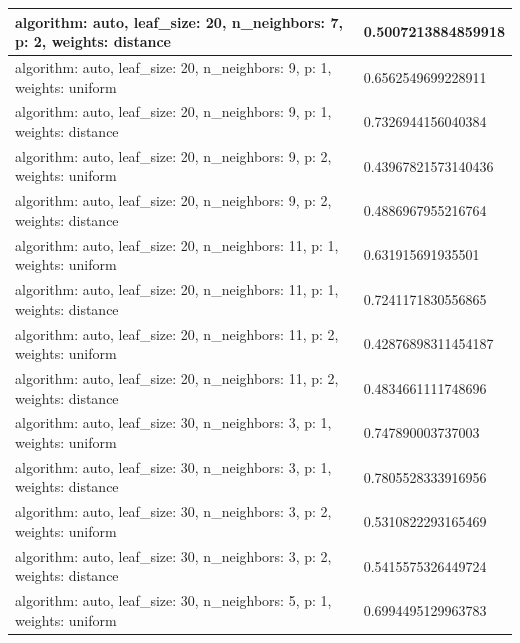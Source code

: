 \documentclass{report}
\begin{document}
{\begin{longtable}{|p{295.6px}|p{100.3px}|}
                    \hline
                    algorithm: auto, leaf\_size: 20, n\_neighbors: 7, p: 2, weights: distance & 0.5007213884859918 \\
                    \hline
                    algorithm: auto, leaf\_size: 20, n\_neighbors: 9, p: 1, weights: uniform & 0.6562549699228911 \\
                    \hline
                    algorithm: auto, leaf\_size: 20, n\_neighbors: 9, p: 1, weights: distance & 0.7326944156040384 \\
                    \hline
                    algorithm: auto, leaf\_size: 20, n\_neighbors: 9, p: 2, weights: uniform & 0.43967821573140436 \\
                    \hline
                    algorithm: auto, leaf\_size: 20, n\_neighbors: 9, p: 2, weights: distance & 0.4886967955216764 \\
                    \hline
                    algorithm: auto, leaf\_size: 20, n\_neighbors: 11, p: 1, weights: uniform & 0.631915691935501 \\
                    \hline
                    algorithm: auto, leaf\_size: 20, n\_neighbors: 11, p: 1, weights: distance & 0.7241171830556865 \\
                    \hline
                    algorithm: auto, leaf\_size: 20, n\_neighbors: 11, p: 2, weights: uniform & 0.42876898311454187 \\
                    \hline
                    algorithm: auto, leaf\_size: 20, n\_neighbors: 11, p: 2, weights: distance & 0.4834661111748696 \\
                    \hline
                    algorithm: auto, leaf\_size: 30, n\_neighbors: 3, p: 1, weights: uniform & 0.747890003737003 \\
                    \hline
                    algorithm: auto, leaf\_size: 30, n\_neighbors: 3, p: 1, weights: distance & 0.7805528333916956 \\
                    \hline
                    algorithm: auto, leaf\_size: 30, n\_neighbors: 3, p: 2, weights: uniform & 0.5310822293165469 \\
                    \hline
                    algorithm: auto, leaf\_size: 30, n\_neighbors: 3, p: 2, weights: distance & 0.5415575326449724 \\
                    \hline
                    algorithm: auto, leaf\_size: 30, n\_neighbors: 5, p: 1, weights: uniform & 0.6994495129963783 \\
                    \hline

\end{longtable}}
\end{document}
